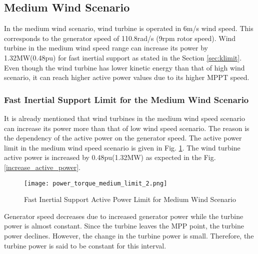 \subsection{Medium Wind Scenario}
In the medium wind scenario, wind turbine is operated in 6m/s wind speed. This corresponds to the generator speed of 110.8rad/s (9rpm rotor speed). Wind turbine in the medium wind speed range can increase its power by 1.32MW(0.48pu) for fast inertial support as stated in the Section \ref{sec:klimit}. Even though the wind turbine has lower kinetic energy than that of high wind scenario, it can reach higher active power values due to its higher MPPT speed. 
\subsubsection{Fast Inertial Support Limit for the Medium Wind Scenario}
It is already mentioned that wind turbines in the medium wind speed scenario can increase its power more than that of low wind speed scenario. The reason is the dependency of the active power on the generator speed. The active power limit in the medium wind speed scenario is given in Fig. \ref{medium_limit_power}. The wind turbine active power is increased by 0.48pu(1.32MW) as expected in the Fig. \ref{increase_active_power}.\par
\begin{figure}[h]
	\centering
	\texttt{[image: power\_torque\_medium\_limit\_2.png]}
	\caption{Fast Inertial Support Active Power Limit for Medium Wind Scenario}
	\label{medium_limit_power}
\end{figure}
 Generator speed decreases due to increased generator power while the turbine power is almost constant. Since the turbine leaves the MPP point, the turbine power declines. However, the change in the turbine power is small. Therefore, the turbine power is said to be constant for this interval. 
